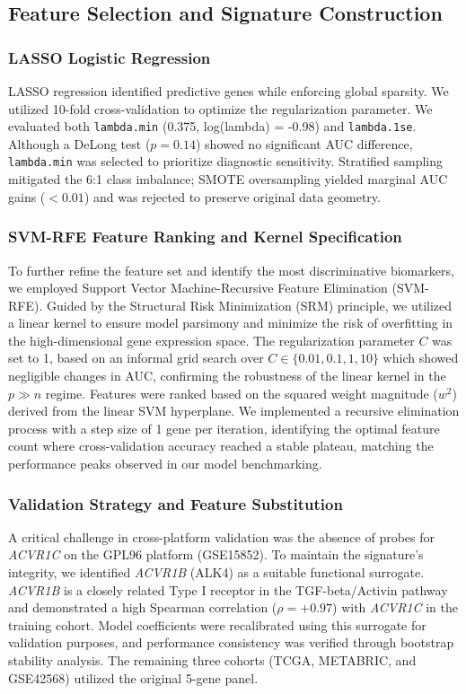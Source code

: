 \documentclass[a4paper,fleqn]{cas-sc}
\begin{document}
\subsection{Feature Selection and Signature Construction}
\subsubsection{LASSO Logistic Regression}
LASSO regression identified predictive genes while enforcing global sparsity. We utilized 10-fold cross-validation to optimize the regularization parameter. We evaluated both \texttt{lambda.min} (0.375, log(lambda) = -0.98) and \texttt{lambda.1se}. Although a DeLong test ($p = 0.14$) showed no significant AUC difference, \texttt{lambda.min} was selected to prioritize diagnostic sensitivity. Stratified sampling mitigated the 6:1 class imbalance; SMOTE oversampling yielded marginal AUC gains ($<0.01$) and was rejected to preserve original data geometry.

\subsubsection{SVM-RFE Feature Ranking and Kernel Specification}
To further refine the feature set and identify the most discriminative biomarkers, we employed Support Vector Machine-Recursive Feature Elimination (SVM-RFE). Guided by the Structural Risk Minimization (SRM) principle, we utilized a linear kernel to ensure model parsimony and minimize the risk of overfitting in the high-dimensional gene expression space. The regularization parameter $C$ was set to 1, based on an informal grid search over $C \in \{0.01, 0.1, 1, 10\}$ which showed negligible changes in AUC, confirming the robustness of the linear kernel in the $p \gg n$ regime. Features were ranked based on the squared weight magnitude ($w^2$) derived from the linear SVM hyperplane. We implemented a recursive elimination process with a step size of 1 gene per iteration, identifying the optimal feature count where cross-validation accuracy reached a stable plateau, matching the performance peaks observed in our model benchmarking.

\subsubsection{Validation Strategy and Feature Substitution}
A critical challenge in cross-platform validation was the absence of probes for \textit{ACVR1C} on the GPL96 platform (GSE15852). To maintain the signature's integrity, we identified \textit{ACVR1B} (ALK4) as a suitable functional surrogate. \textit{ACVR1B} is a closely related Type I receptor in the TGF-beta/Activin pathway and demonstrated a high Spearman correlation ($\rho = +0.97$) with \textit{ACVR1C} in the training cohort. Model coefficients were recalibrated using this surrogate for validation purposes, and performance consistency was verified through bootstrap stability analysis. The remaining three cohorts (TCGA, METABRIC, and GSE42568) utilized the original 5-gene panel.
\end{document}
